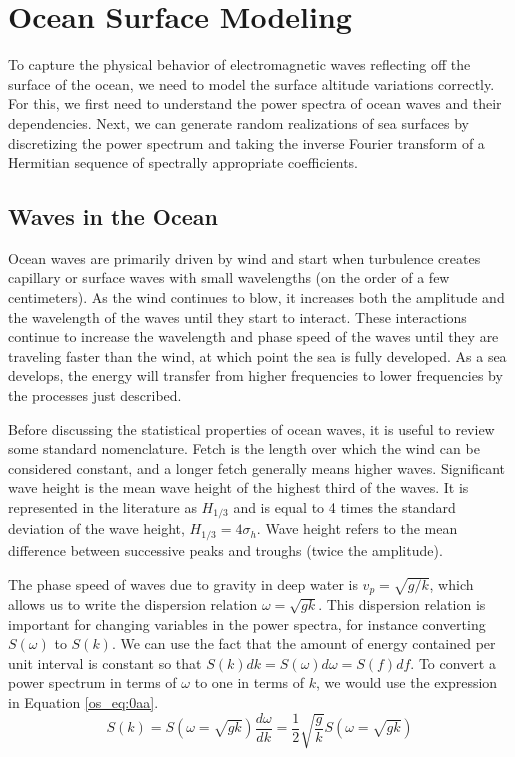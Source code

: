\chapter{Ocean Surface Modeling}
To capture the physical behavior of electromagnetic waves reflecting off the surface of the ocean, we need to model the surface altitude variations correctly. For this, we first need to understand the power spectra of ocean waves and their dependencies. Next, we can generate random realizations of sea surfaces by discretizing the power spectrum and taking the inverse Fourier transform of a Hermitian sequence of spectrally appropriate coefficients.

\section {Waves in the Ocean}
Ocean waves are primarily driven by wind and start when turbulence creates capillary or surface waves with small wavelengths (on the order of a few centimeters). As the wind continues to blow, it increases both the amplitude and the wavelength of the waves until they start to interact. These interactions continue to increase the wavelength and phase speed of the waves until they are traveling faster than the wind, at which point the sea is fully developed. As a sea develops, the energy will transfer from higher frequencies to lower frequencies by the processes just described.

Before discussing the statistical properties of ocean waves, it is useful to review some standard nomenclature. Fetch is the length over which the wind can be considered constant, and a longer fetch generally means higher waves. Significant wave height is the mean wave height of the highest third of the waves. It is represented in the literature as $H_{1/3}$ and is equal to 4 times the standard deviation of the wave height, $H_{1/3} = 4\sigma_h$. Wave height refers to the mean difference between successive peaks and troughs (twice the amplitude).

The phase speed of waves due to gravity in deep water is $v_p=\sqrt{g/k}$, which allows us to write the dispersion relation $\omega = \sqrt{gk}$. This dispersion relation is important for changing variables in the power spectra, for instance converting $S(\omega)$ to $S(k)$. We can use the fact that the amount of energy contained per unit interval is constant so that $S(k)dk = S(\omega)d\omega = S(f)df$. To convert a power spectrum in terms of $\omega$ to one in terms of $k$, we would use the expression in Equation \ref{os_eq:0aa}.
\begin{equation}
  \label{os_eq:0aa}
  S(k) = S(\omega = \sqrt{gk})\frac{d\omega}{dk} = \frac{1}{2}\sqrt{\frac{g}{k}}S(\omega=\sqrt{gk})
  \end{equation}

